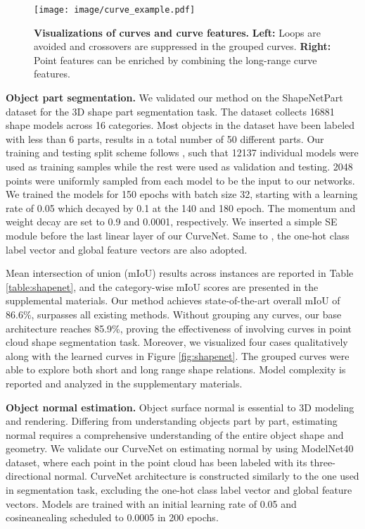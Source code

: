 \documentclass[10pt,twocolumn,letterpaper]{article}
\theoremstyle{definition}
\begin{document}
\begin{figure}[t]
	\begin{center}
\texttt{[image: image/curve\_example.pdf]}
	\end{center}
	\caption{\textbf{Visualizations of curves and curve features.} \textbf{Left:} Loops are avoided and crossovers are suppressed in the grouped curves. \textbf{Right:} Point features can be enriched by combining the long-range curve features.}
	\label{fig:curves}
\end{figure}
\noindent
\textbf{Object part segmentation.} We validated our method on the ShapeNetPart dataset \cite{yi2016scalable} for the 3D shape part segmentation task. The dataset collects 16881 shape models across 16 categories. Most objects in the dataset have been labeled with less than 6 parts, results in a total number of 50 different parts. Our training and testing split scheme follows \cite{qi2017pointnet, qi2017pointnet++}, such that 12137 individual models were used as training samples while the rest were used as validation and testing. 2048 points were uniformly sampled from each model to be the input to our networks. We trained the models for 150 epochs with batch size 32, starting with a learning rate of 0.05 which decayed by 0.1 at the 140 and 180 epoch. The momentum and weight decay are set to 0.9 and 0.0001, respectively. We inserted a simple SE \cite{hu2018squeeze} module before the last linear layer of our CurveNet. Same to \cite{liu2019relation, bytyqi2020local}, the one-hot class label vector and global feature vectors are also adopted.

Mean intersection of union (mIoU) results across instances are reported in Table \ref{table:shapenet}, and the category-wise mIoU scores are presented in the supplemental materials. Our method achieves state-of-the-art overall mIoU of 86.6\%, surpasses all existing methods. Without grouping any curves, our base architecture reaches 85.9\%, proving the effectiveness of involving curves in point cloud shape segmentation task. Moreover, we visualized four cases qualitatively along with the learned curves in Figure \ref{fig:shapenet}. The grouped curves were able to explore both short and long range shape relations. Model complexity is reported and analyzed in the supplementary materials.

\noindent
\textbf{Object normal estimation.} Object surface normal is essential to 3D modeling and rendering. Differing from understanding objects part by part, estimating normal requires a comprehensive understanding of the entire object shape and geometry. We validate our CurveNet on estimating normal by using ModelNet40 dataset, where each point in the point cloud has been labeled with its three-directional normal. CurveNet architecture is constructed similarly to the one used in segmentation task, excluding the one-hot class label vector and global feature vectors. Models are trained with an initial learning rate of 0.05 and cosineanealing scheduled to 0.0005 in 200 epochs.
\end{document}
